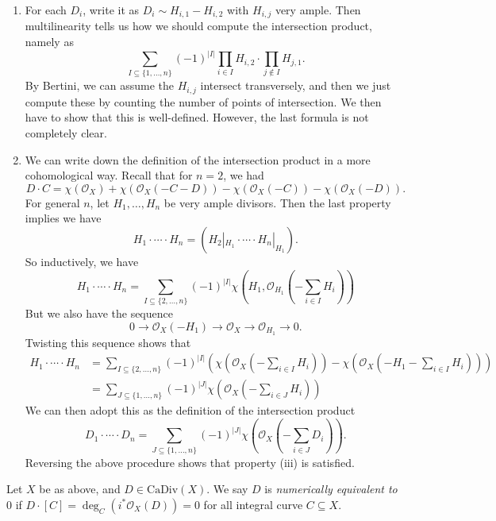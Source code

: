 \documentclass[a4paper]{article}
\newcommand\CaDiv{\mathrm{CaDiv}}
\begin{document}
\begin{enumerate}
  \item For each $D_i$, write it as $D_i \sim H_{i, 1} - H_{i, 2}$ with $H_{i, j}$ very ample. Then multilinearity tells us how we should compute the intersection product, namely as
    \[
      \sum_{I \subseteq \{1, \ldots, n\}} (-1)^{|I|} \prod_{i \in I} H_{i, 2} \cdot \prod_{j \not \in I} H_{j, 1}.
    \]
    By Bertini, we can assume the $H_{i, j}$ intersect transversely, and then we just compute these by counting the number of points of intersection. We then have to show that this is well-defined. However, the last formula is not completely clear.
  \item We can write down the definition of the intersection product in a more cohomological way. Recall that for $n = 2$, we had
    \[
      D \cdot C = \chi(\mathcal{O}_X) + \chi(\mathcal{O}_X(-C - D)) - \chi(\mathcal{O}_X (-C)) - \chi(\mathcal{O}_X(-D)).
    \]
    For general $n$, let $H_1, \ldots, H_n$ be very ample divisors. Then the last property implies we have
    \[
      H_1 \cdot \cdots \cdot H_n = (H_2|_{H_1} \cdot \cdots \cdot H_n|_{H_1}).
    \]
    So inductively, we have
    \[
      H_1 \cdot \cdots \cdot H_n = \sum_{I \subseteq \{2, \ldots, n\}} (-1)^{|I|} \chi\left(H_1, \mathcal{O}_{H_1}\left(- \sum_{i \in I} H_i\right)\right)
    \]
    But we also have the sequence
    \[
      0 \to \mathcal{O}_X(-H_1) \to \mathcal{O}_X \to \mathcal{O}_{H_1} \to 0.
    \]
    Twisting this sequence shows that
    \begin{align*}
      H_1 \cdot \cdots \cdot H_n &= \sum_{I \subseteq \{2, \ldots, n\}} (-1)^{|I|}\left(\chi\left(\mathcal{O}_X\left(- \sum_{i \in I} H_i\right)\right) - \chi\left(\mathcal{O}_X\left(- H_1 - \sum_{i \in I} H_i\right)\right)\right)\\
      &= \sum_{J \subseteq \{1, \ldots, n\}} (-1)^{|J|} \chi\left(\mathcal{O}_X\left(- \sum_{i \in J} H_i\right)\right)
    \end{align*}
    We can then adopt this as the definition of the intersection product
    \[
      D_1 \cdot \cdots \cdot D_n = \sum_{J \subseteq \{1, \ldots, n\}} (-1)^{|J|} \chi\left(\mathcal{O}_X\left(- \sum_{i \in J} D_i\right)\right).
    \]
    Reversing the above procedure shows that property (iii) is satisfied.
\end{enumerate}

\begin{defi}
  Let $X$ be as above, and $D \in \CaDiv(X)$. We say $D$ is \emph{numerically equivalent to $0$} if $D \cdot [C] = \deg_C (i^* \mathcal{O}_X(D)) = 0$ for all integral curve $C \subseteq X$.
\end{defi}
\end{document}
